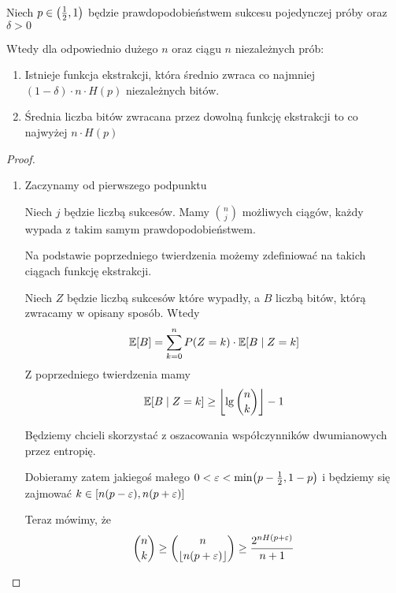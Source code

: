 \begin{theorem}[Twierdzenie 10.5 P\&C]
    Niech \( p \in \left(\frac{1}{2}, 1\right) \) będzie prawdopodobieństwem sukcesu pojedynczej próby oraz \( \delta > 0 \)
    
    Wtedy dla odpowiednio dużego \( n \) oraz ciągu \( n \) niezależnych prób:
    \begin{enumerate}
        \item Istnieje funkcja ekstrakcji, która średnio zwraca co najmniej \((1 - \delta) \cdot n \cdot H(p) \) niezależnych bitów.
        \item Średnia liczba bitów zwracana przez dowolną funkcję ekstrakcji to co najwyżej \( n \cdot H(p) \)
    \end{enumerate}
\end{theorem}
\begin{proof} \( \)
\begin{enumerate}
    \item Zaczynamy od pierwszego podpunktu
    
    Niech \( j \) będzie liczbą sukcesów. Mamy \( \binom{n}{j} \) możliwych ciągów, każdy wypada z takim samym prawdopodobieństwem.
    
    Na podstawie poprzedniego twierdzenia możemy zdefiniować na takich ciągach funkcję ekstrakcji.
    
    Niech \( Z \) będzie liczbą sukcesów które wypadły, a \( B \) liczbą bitów, którą zwracamy w opisany sposób. Wtedy
    \[
        \expected{B} = \sum_{k=0}^n P(Z = k) \cdot \expected{B \mid Z = k}
    \]
    Z poprzedniego twierdzenia mamy
    \[
        \expected{B \mid Z = k} \geq \floor{\lg \binom{n}{k}} - 1
    \]
    
    Będziemy chcieli skorzystać z oszacowania współczynników dwumianowych przez entropię.
    
    Dobieramy zatem jakiegoś małego \( 0 < \varepsilon < \min\pars{p-\frac{1}{2}, 1-p} \)
    i będziemy się zajmować \( k \in \left[n(p-\varepsilon), n(p+\varepsilon)\right] \)
    
    Teraz mówimy, że 
    \[
        \binom{n}{k} \geq \binom{n}{\left\lfloor n(p+\varepsilon)\right\rfloor} \geq \frac{2^{nH(p + \varepsilon)}}{n+1}
    \]
    

\end{enumerate}
\end{proof}
